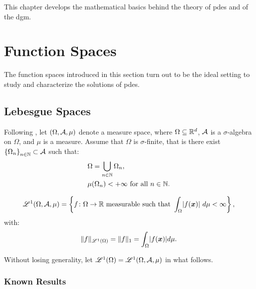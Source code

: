 This chapter develops the mathematical basics behind the theory of \acrlong{pdes} and of the \acrlong{dgm}.

\section{Function Spaces}

The function spaces introduced in this section turn out to be the ideal setting to study and characterize the solutions of \acrshort{pdes}.

\subsection{Lebesgue Spaces}

Following \cite[p. 89]{Brezis2010}, let $(\Omega, \mathcal{A}, \mu)$ denote a measure space, where $\Omega \subseteq \mathbb{R}^{d}$, $\mathcal{A}$ is a $\sigma$-algebra on $\Omega$, and $\mu$ is a measure. Assume that $\Omega$ is $\sigma$-finite, that is there exist $\left\{ \Omega_n \right\}_{n \in \mathbb{N}} \subset \mathcal{A}$ such that:
\begin{align}
    & \Omega = \bigcup_{n \in \mathbb{N}} \Omega_n, \\
    & \mu(\Omega_n) < +\infty \text{ for all } n \in \mathbb{N}.
\end{align}

\begin{definition}[$\Lp{1}(\Omega, \SA, \mu)$]
    \begin{gather}
        \mathscr{L}^{1}(\Omega, \mathcal{A}, \mu) = \left\{ f \colon \Omega \rightarrow \mathbb{R} \text{ measurable such that } \int_{\Omega} \lvert f(\bm{x}) \rvert ~ d \mu < \infty \right\},
    \end{gather}
    with:
    \begin{gather}
    \lVert f \rVert_{\mathscr{L}^{1}(\Omega)} = \lVert f \rVert_{1} = \int_{\Omega} \lvert f(\bm{x}) \rvert d \mu.
    \end{gather}
\end{definition}

Without losing generality, let $\mathscr{L}^{1}(\Omega) = \mathscr{L}^{1}(\Omega, \mathcal{A}, \mu)$ in what follows.

\subsubsection{Known Results}

